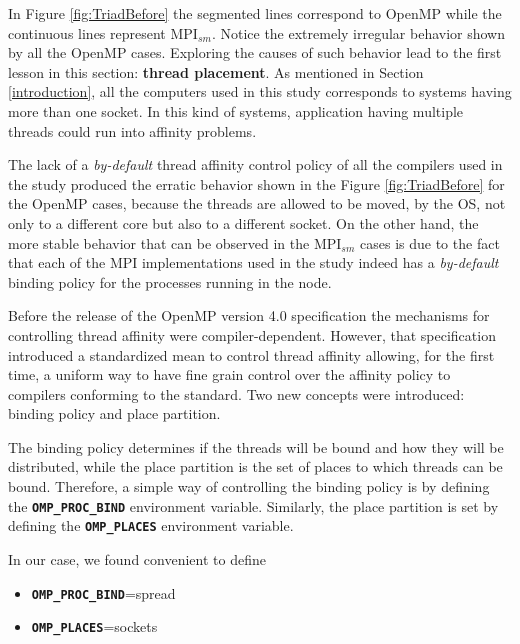 In Figure \ref{fig:TriadBefore} the segmented lines correspond to OpenMP while the continuous lines represent MPI$_{sm}$. Notice the extremely irregular behavior shown by all the OpenMP cases. Exploring the causes of such behavior lead to the first lesson in this section: \textbf{thread placement}. As mentioned in Section \ref{introduction}, all the computers used in this study corresponds to systems having more than one socket. In this kind of systems, application having multiple threads could run into affinity problems.

\medskip

The lack of a \emph{by-default} thread affinity control policy of all the compilers used in the study produced the erratic behavior shown in the Figure \ref{fig:TriadBefore} for the OpenMP cases, because the threads are allowed to be moved, by the OS, not only to a different core but also to a different socket. On the other hand, the more stable behavior that can be observed in the MPI$_{sm}$ cases is due to the fact that each of the MPI implementations used in the study indeed has a \emph{by-default} binding policy for the processes running in the node.

\medskip


Before the release of the OpenMP version 4.0 specification the mechanisms for controlling thread affinity were compiler-dependent. However, that specification introduced a standardized mean to control thread affinity allowing, for the first time, a uniform way to have fine grain control over the affinity policy to compilers conforming to the standard. Two new concepts were introduced: binding policy and place partition.

The binding policy determines if the threads will be bound and how they will be distributed, while the place partition is the set of places to which threads can be bound. Therefore, a simple way of controlling the binding policy is by defining the \textbf{\texttt{OMP\_PROC\_BIND}} environment variable. Similarly, the place partition is set by defining the \textbf{\texttt{OMP\_PLACES}} environment variable.

\medskip

In our case, we found convenient to define

\begin{itemize} 

\item \textbf{\texttt{OMP\_PROC\_BIND}}=spread 

\item \textbf{\texttt{OMP\_PLACES}}=sockets

\end{itemize}


